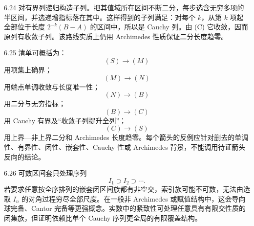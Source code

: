 \begin{solution}{6.24}
对有界列递归构造子列。把其值域所在区间不断二分，每步选含无穷多项的半区间，并选递增指标落在其中。这样得到的子列满足：对每个 \(k\)，从第 \(k\) 项起全部位于长度 \(2^{-k}(B-A)\) 的区间中，所以是 Cauchy 列。由 (C) 它收敛，因而原列有收敛子列。该路线实质上仍用 Archimedes 性质保证二分长度趋零。
\end{solution}

\begin{solution}{6.25}
清单可概括为：
\[
 (S)\to(M)
\]
用项集上确界；
\[
 (M)\to(N)
\]
用端点单调收敛与长度唯一性；
\[
 (N)\to(B)
\]
用二分与无穷指标；
\[
 (B)\to(C)
\]
用 Cauchy 有界及“收敛子列提升全列”；
\[
 (C)\to(S)
\]
用上界—非上界二分和 Archimedes 长度趋零。每个箭头的反例应针对删去的单调性、有界性、闭性、嵌套性、Cauchy 性或 Archimedes 背景，不能调用待证箭头反向的结论。
\end{solution}

\begin{solution}{6.26}
可数区间套只处理序列
\[
 I_1\supset I_2\supset\cdots.
\]
若要求任意按全序排列的嵌套闭区间族都有非空交，索引族可能不可数，无法由选取 \(I_n\) 的对角过程穷尽全部尺度。在一般非 Archimedes 或赋值结构中，这会导向球完备、Cantor 完备等更强概念。实数中的紧致性可处理任意具有有限交性质的闭集族，但证明依赖比单个 Cauchy 序列更全局的有限覆盖结构。
\end{solution}
